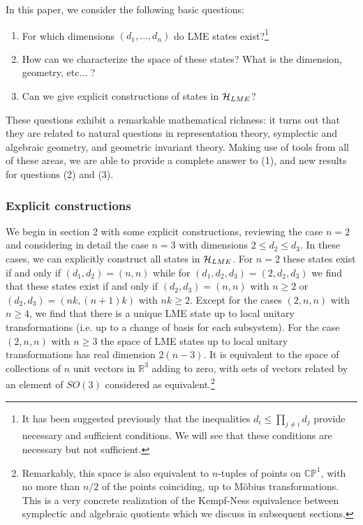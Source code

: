 \documentclass[12pt]{article}
\theoremstyle{definition}
\begin{document}
In this paper, we consider the following basic questions:
\begin{enumerate}
\item
For which dimensions $(d_1,\dots,d_n)$ do LME states exist?\footnote{It has been suggested previously that the inequalities $d_i \le \prod_{j \ne i} d_j$ provide necessary and sufficient conditions. We will see that these conditions are necessary but not sufficient.}
\item
How can we characterize the space of these states? What is the dimension, geometry, etc... ?
\item
Can we give explicit constructions of states in ${\cal H}_{LME}$?
\end{enumerate}
These questions exhibit a remarkable mathematical richness: it turns out that they are related to natural questions in representation theory, symplectic and algebraic geometry, and geometric invariant theory. Making use of tools from all of these areas, we are able to provide a complete answer to (1), and new results for questions (2) and (3).

\subsubsection*{Explicit constructions}

We begin in section 2 with some explicit constructions, reviewing the
case $n=2$ and considering in detail the case $n=3$ with dimensions $2
\le d_2 \le d_3$. In these cases, we can explicitly construct all
states in ${\cal H}_{LME}$. For $n=2$ these states exist if and only
if $(d_1,d_2) = (n,n)$ while for $(d_1, d_2, d_3) = (2,d_2,d_3)$ we
find that these states exist if and only if $(d_2,d_3) = (n,n)$ with
$n \ge 2$ or $(d_2,d_3) = (nk,(n+1)k)$ with $nk \ge 2$. Except for the
cases $(2,n,n)$ with $n \ge 4$, we find that there is a unique LME
state up to local unitary transformations (i.e. up to a change of
basis for each subsystem). For the case $(2,n,n)$ with $n \ge 3$ the
space of LME states up to local unitary transformations has real
dimension $2(n-3)$. It is equivalent to the space of collections of
$n$ unit vectors in $\mathbb{R}^3$ adding to zero, with sets of
vectors related by an element of $SO(3)$ considered as
equivalent.\footnote{Remarkably, this space is also equivalent to $n$-tuples of
points on $\mathbb{CP}^{1}$, with no more than $n/2$ of the points
coinciding, up to M\"obius transformations. This is a very concrete
realization of the Kempf-Ness equivalence between symplectic
and algebraic quotients which we discuss in subsequent sections.}
\end{document}
